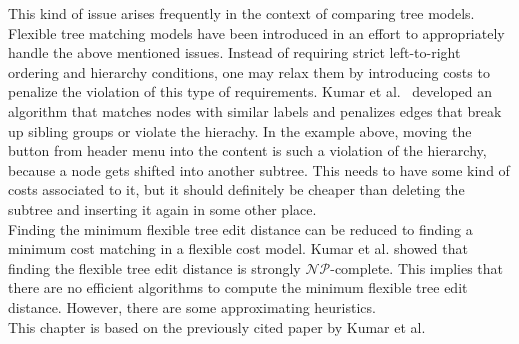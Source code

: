 This kind of issue arises frequently in the context of comparing tree models. Flexible tree matching models have been introduced in an effort to appropriately handle the above mentioned issues. Instead of requiring strict left-to-right ordering and hierarchy conditions, one may relax them by introducing costs to penalize the violation of this type of requirements. Kumar et al.~\cite{Kum} developed an algorithm that matches nodes with similar labels and penalizes edges that break up sibling groups or violate the hierachy. In the example above, moving the button from header menu into the content is such a violation of the hierarchy, because a node gets shifted into another subtree. This needs to have some kind of costs associated to it, but it should definitely be cheaper than deleting the subtree and inserting it again in some other place.\\
Finding the minimum flexible tree edit distance can be reduced to finding a minimum cost matching in a flexible cost model. Kumar et al. showed that finding the flexible tree edit distance is strongly $\mathcal{NP}$-complete. This implies that there are no efficient algorithms to compute the minimum flexible tree edit distance. However, there are some approximating heuristics.\\
This chapter is based on the previously cited paper by Kumar et al. 

